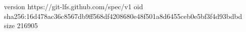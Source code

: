 version https://git-lfs.github.com/spec/v1
oid sha256:16d478ac36c8567db9ff568df4208680e48f501a8d6455ceb0e5bf3f4d93bdbd
size 216905
